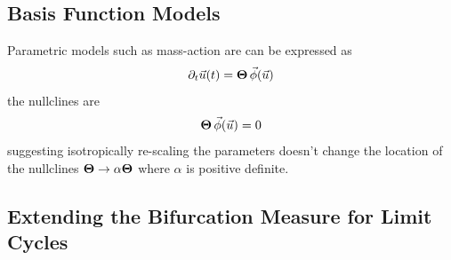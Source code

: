 \subsection{Basis Function Models}
Parametric models such as mass-action are can be expressed as
\begin{equation}
    \partial_t\vec{u}(t) = \mathbf{\Theta}\,\vec{\phi}(\vec{u})
\end{equation}
the nullclines are
\begin{equation}
    \mathbf{\Theta}\,\vec{\phi}(\vec{u}) = 0
\end{equation}
suggesting isotropically re-scaling the parameters
doesn't change the location of the nullclines $\mathbf{\Theta}\rightarrow\alpha\mathbf{\Theta}$
where $\alpha$ is positive definite.

\subsection{Extending the Bifurcation Measure for Limit Cycles}

